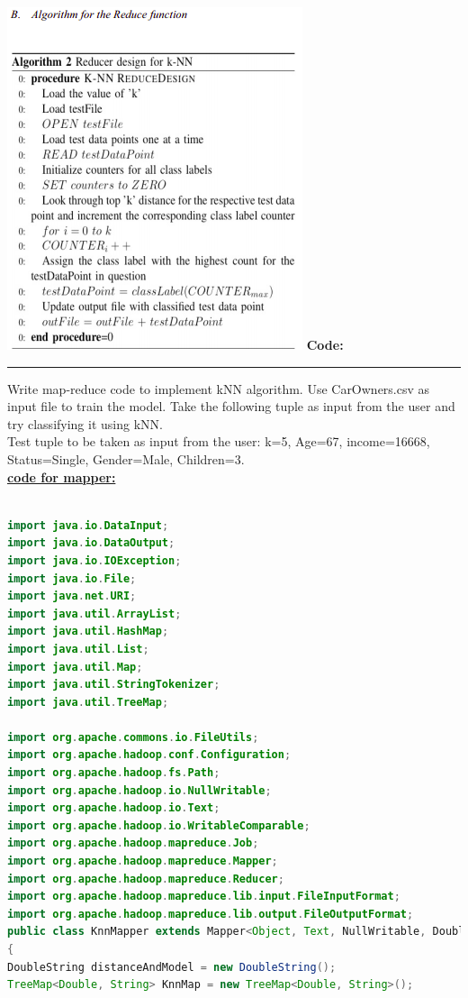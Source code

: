\documentclass[11pt,article]{memoir}
\begin{document}
\begin{flushleft}
	\includegraphics{reduce.png}
\afterpage{\newpage}\newpage
\textbf{Code:}\hrule
\vspace{0.5cm}
Write map-reduce code to implement kNN algorithm. Use CarOwners.csv as input file to train the model. Take the following tuple as input from the user and try classifying it using kNN.\\
Test tuple to be taken as input from the user: k=5, Age=67, income=16668, Status=Single, Gender=Male, Children=3.\\
\textbf{\underline{code for mapper:}}

\begin{lstlisting}[language=java]

import java.io.DataInput;
import java.io.DataOutput;
import java.io.IOException;
import java.io.File;
import java.net.URI;
import java.util.ArrayList;
import java.util.HashMap;
import java.util.List;
import java.util.Map;
import java.util.StringTokenizer;
import java.util.TreeMap;

import org.apache.commons.io.FileUtils;
import org.apache.hadoop.conf.Configuration;
import org.apache.hadoop.fs.Path;
import org.apache.hadoop.io.NullWritable;
import org.apache.hadoop.io.Text;
import org.apache.hadoop.io.WritableComparable;
import org.apache.hadoop.mapreduce.Job;
import org.apache.hadoop.mapreduce.Mapper;
import org.apache.hadoop.mapreduce.Reducer;
import org.apache.hadoop.mapreduce.lib.input.FileInputFormat;
import org.apache.hadoop.mapreduce.lib.output.FileOutputFormat;
public class KnnMapper extends Mapper<Object, Text, NullWritable, DoubleString>
{
DoubleString distanceAndModel = new DoubleString();
TreeMap<Double, String> KnnMap = new TreeMap<Double, String>();


\end{lstlisting}
\end{flushleft}
\end{document}
